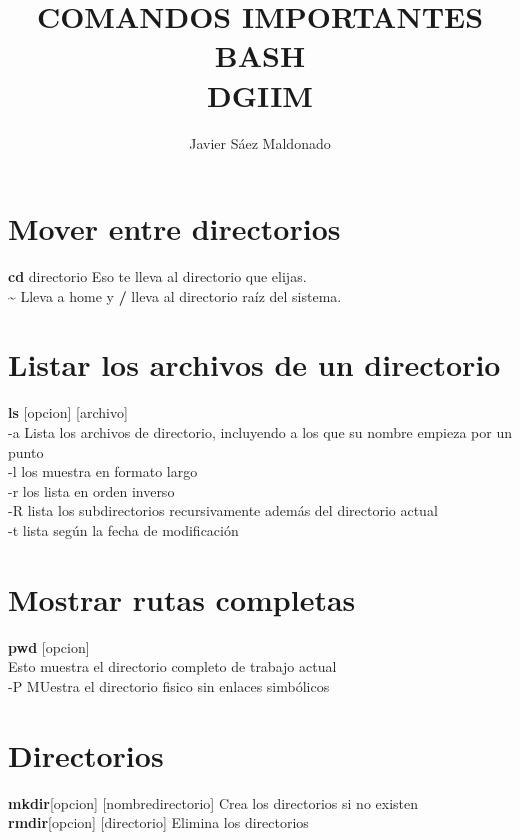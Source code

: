 \documentclass[11pt]{article}
\title{\textbf{COMANDOS IMPORTANTES BASH\\ DGIIM}}
\author{Javier S\'aez Maldonado}
\date{}
\begin{document}
\maketitle

\section{Mover entre directorios}
\textbf{cd} directorio
Eso te lleva al directorio que elijas.\\
\textbf{\~}  Lleva a home y \textbf{/} lleva al directorio ra\'iz del sistema.

\section{Listar los archivos de un directorio}
\textbf{ls} [opcion]  [archivo] \\


-a \hspace{2cm} Lista los archivos de directorio, incluyendo a los que su nombre empieza por un punto
\\

-l \hspace{2cm} los muestra en formato largo
\\

-r \hspace{2cm} los lista en orden inverso
\\

-R \hspace{2cm} lista los subdirectorios recursivamente además del direc\hspace{2cm}torio actual
\\

-t \hspace{2cm} lista según la fecha de modificación

\section{Mostrar rutas completas}
\textbf{pwd} [opcion]\\
Esto muestra el directorio completo de trabajo actual\\
-P \hspace{2cm} MUestra el directorio fisico sin enlaces simbólicos

\section{Directorios}
\textbf{mkdir}[opcion] [nombredirectorio] \hspace{2cm} Crea los directorios si no existen\\
\textbf{rmdir}[opcion] [directorio] \hspace{2cm} Elimina los directorios\\
\end{document}
